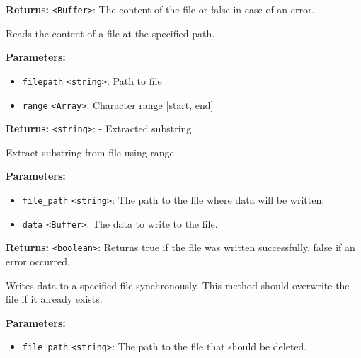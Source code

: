 \documentclass[12pt,a4paper]{article}
\begin{document}
\noindent \textbf{Returns:} \texttt{<Buffer>}: The content of the file or false in case of an error.

\noindent Reads the content of a file at the specified path.

\vspace{5mm}
\noindent {}


\noindent \textbf{Parameters:}
\begin{itemize}
  \item \texttt{filepath} \texttt{<string>}: Path to file
  \item \texttt{range} \texttt{<Array>}: Character range [start, end]
\end{itemize}

\noindent \textbf{Returns:} \texttt{<string>}: - Extracted substring

\noindent Extract substring from file using range

\vspace{5mm}
\noindent {}


\noindent \textbf{Parameters:}
\begin{itemize}
  \item \texttt{file\_path} \texttt{<string>}: The path to the file where data will be written.
  \item \texttt{data} \texttt{<Buffer>}: The data to write to the file.
\end{itemize}

\noindent \textbf{Returns:} \texttt{<boolean>}: Returns true if the file was written successfully, false if an error occurred.

\noindent Writes data to a specified file synchronously. This method should overwrite the file if it already exists.

\vspace{5mm}
\noindent {}


\noindent \textbf{Parameters:}
\begin{itemize}
  \item \texttt{file\_path} \texttt{<string>}: The path to the file that should be deleted.
\end{itemize}
\end{document}
